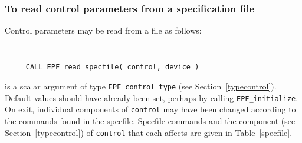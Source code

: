 \documentclass{galahad}
\newcommand{\packagename}{EPF}
\begin{document}
\subsubsection{To read control parameters from a specification file}
\label{readspec}

Control parameters may be read from a file as follows:
\hskip0.5in
\def\baselinestretch{0.8} {\tt
\begin{verbatim}
     CALL EPF_read_specfile( control, device )
\end{verbatim}
}
\def\baselinestretch{1.0}

\begin{description}
 is a scalar \intentinout argument of type
{\tt \packagename\_control\_type}
(see Section~\ref{typecontrol}).
Default values should have already been set, perhaps by calling
{\tt \packagename\_initialize}.
On exit, individual components of {\tt control} may have been changed
according to the commands found in the specfile. Specfile commands and
the component (see Section~\ref{typecontrol}) of {\tt control}
that each affects are given in Table~\vref{specfile}.


\end{description}
\end{document}
